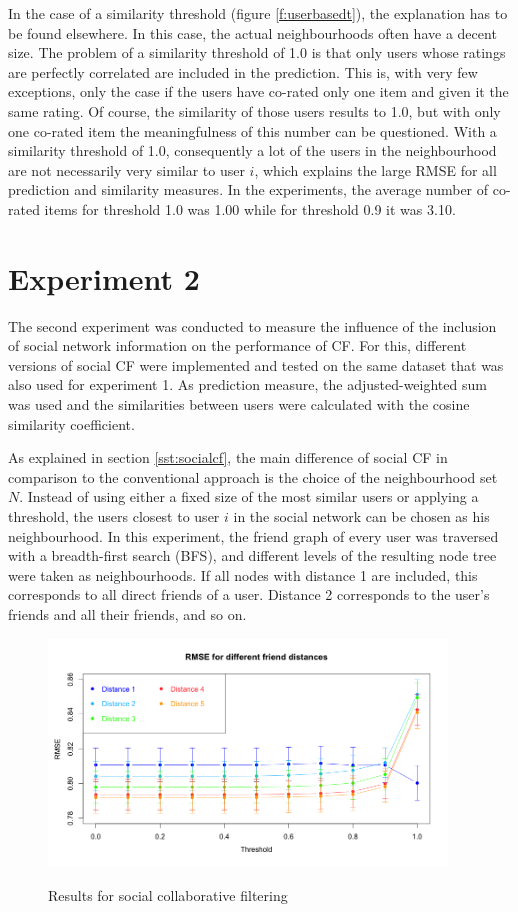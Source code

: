 In the case of a similarity threshold (figure \ref{f:userbasedt}), the explanation has to be found elsewhere. In this case, the actual neighbourhoods often have a decent size. The problem of a similarity threshold of 1.0 is that only users whose ratings are perfectly correlated are included in the prediction. This is, with very few exceptions, only the case if the users have co-rated only one item and given it the same rating. Of course, the similarity of those users results to 1.0, but with only one co-rated item the meaningfulness of this number can be questioned. With a similarity threshold of 1.0, consequently a lot of the users in the neighbourhood are not necessarily very similar to user $i$, which explains the large RMSE for all prediction and similarity measures. In the experiments, the average number of co-rated items for threshold 1.0 was 1.00 while for threshold 0.9 it was 3.10.
\section{Experiment 2}
\label{st:experiment2} The second experiment was conducted to measure the influence of the inclusion of social network information on the performance of CF. For this, different versions of social CF were implemented and tested on the same dataset that was also used for experiment 1. As prediction measure, the adjusted-weighted sum was used and the similarities between users were calculated with the cosine similarity coefficient.

As explained in section \ref{sst:socialcf}, the main difference of social CF in comparison to the conventional approach is the choice of the neighbourhood set $N$. Instead of using either a fixed size of the most similar users or applying a threshold, the users closest to user $i$ in the social network can be chosen as his neighbourhood. In this experiment, the friend graph of every user was traversed with a breadth-first search (BFS), and different levels of the resulting node tree were taken as neighbourhoods. If all nodes with distance 1 are included, this corresponds to all direct friends of a user. Distance 2 corresponds to the user's friends and all their friends, and so on.

\begin{figure}[!ht]
\includegraphics[width=400px]{./4-experiments/figures/SOCIALUSERBASED_V3.png}
\label{f:socialuserbased}
\caption{Results for social collaborative filtering}
\end{figure}

